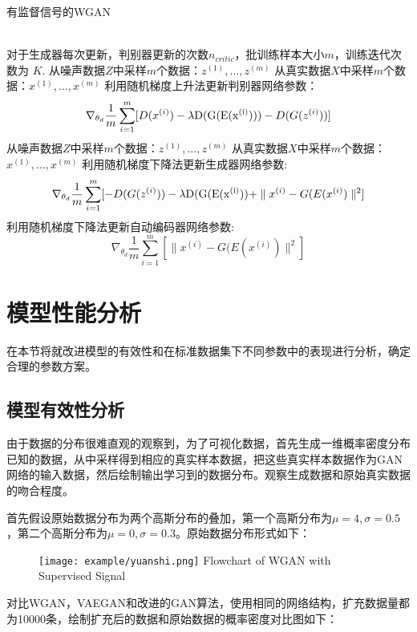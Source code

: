 \begin{algorithm}[!htpb]
	\caption{有监督信号的WGAN}%
	\begin{algorithmic}[1]%
		\Require ~~ \\
		对于生成器每次更新，判别器更新的次数$n_{critic}$，批训练样本大小$m$，训练迭代次数为 $K$.
		\State 从噪声数据$Z$中采样$m$个数据：${z^{(1)},...,z^{(m)}}$
		\State 从真实数据$X$中采样$m$个数据：${x^{(1)},...,x^{(m)}}$ 
		\State 利用随机梯度上升法更新判别器网络参数：
		\begin{equation*}
		\nabla_{\theta_{d}}\frac{1}{m}\sum_{i=1}^m[D(x^{(i)})-\lambda {\rm{D(G(E(x^{(i)})))}}-D(G(z^{(i)}))]  
		\end{equation*}
		\EndFor
		\State 从噪声数据$Z$中采样$m$个数据：${z^{(1)},...,z^{(m)}}$
		\State 从真实数据$X$中采样$m$个数据：${x^{(1)},...,x^{(m)}}$
		\State 利用随机梯度下降法更新生成器网络参数:
		\begin{equation*}
		\nabla_{\theta_{d}}\frac{1}{m}\sum_{i=1}^m[-D(G(z^{(i)}))-\lambda {\rm{D(G(E(x^{(i)}))}}+\parallel x^{(i)}-G(E(x^{(i)})\parallel^{2}]
		\end{equation*}
		\State 利用随机梯度下降法更新自动编码器网络参数:
		\begin{equation*}
		\nabla_{\theta_{d}}\frac{1}{m}\sum_{i=1}^m[\parallel x^{(i)}-G(E(x^{(i)})\parallel^{2}]
		\end{equation*}
		\EndFor
	\end{algorithmic}
\end{algorithm}
\section{模型性能分析}
在本节将就改进模型的有效性和在标准数据集下不同参数中的表现进行分析，确定合理的参数方案。
\subsection{模型有效性分析}
由于数据的分布很难直观的观察到，为了可视化数据，首先生成一维概率密度分布已知的数据，从中采样得到相应的真实样本数据，把这些真实样本数据作为GAN网络的输入数据，然后绘制输出学习到的数据分布。观察生成数据和原始真实数据的吻合程度。

首先假设原始数据分布为两个高斯分布的叠加，第一个高斯分布为$\mu=4,\sigma=0.5$，第二个高斯分布为$\mu=0,\sigma=0.3$。原始数据分布形式如下：
\begin{figure}[!htp]
	\centering
	\texttt{[image: example/yuanshi.png]}
	{Flowchart of WGAN with Supervised Signal}
	\label{figyuanshi}
\end{figure}
对比WGAN，VAEGAN和改进的GAN算法，使用相同的网络结构，扩充数据量都为10000条，绘制扩充后的数据和原始数据的概率密度对比图如下：


